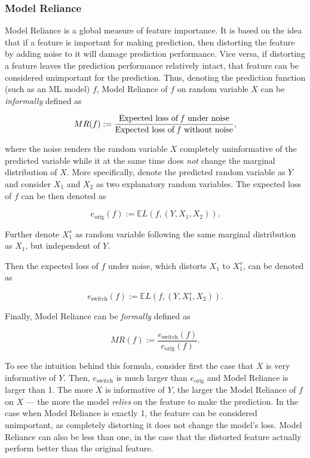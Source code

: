 		\subsubsection{Model Reliance}
			Model Reliance \citep{fisher2019all} is a global measure of feature importance. It is based on the idea that if a feature is important for making prediction, then distorting the feature by adding noise to it will damage prediction performance. Vice versa, if distorting a feature leaves the prediction performance relatively intact, that feature can be considered unimportant for the prediction. Thus, denoting  the prediction function (such as an ML model) $f$, Model Reliance of  $f$ on random variable $X$ can be \textit{informally} defined as
			
			\begin{equation*}
				MR(f):=\frac{\text{Expected loss of \textit{f} under noise}}{\text{Expected loss of \textit{f} without noise}},
			\end{equation*}
			
			where the noise renders the random variable $X$ completely uninformative of the predicted variable while it at the same time does \textit{not} change the marginal distribution of $X$. More specifically, denote the predicted random variable as $Y$ and consider $X_1$ and $X_2$ as two explanatory random variables. The expected loss of $f$ can be then denoted as 
			
			\begin{equation*}
				e_{\text{orig}}(f):= \mathbb{E} L(f,(Y,X_1, X_2)).
			\end{equation*} 
			
			Further denote $X_1^s$ as random variable following the same marginal distribution as $X_1$, but independent of $Y$. 
			
			Then the expected loss of $f$ under noise, which distorts $X_1$ to $X_1^s$, can be denoted as 
			
			\begin{equation*}
				e_{\text{switch}}(f):= \mathbb{E} L(f,(Y,X_1^s, X_2)).
			\end{equation*} 
			
			Finally, Model Reliance can be \textit{formally} defined as 
			
			\begin{equation*}
				MR(f):=\frac{e_{\text{switch}}(f)}{e_{\text{orig}}(f)}.
			\end{equation*}
			
			To see the intuition behind this formula, consider first the case that $X$ is very informative of $Y$. Then, 	$e_{\text{switch}}$ is much larger than $e_{\text{orig}}$ and Model Reliance is larger than 1. The more $X$ is informative of $Y$, the larger the  Model Reliance of $f$ on $X$ --- the more the model \textit{relies} on the feature to make the prediction. In the case when Model Reliance is exactly 1, the feature can be considered unimportant, as completely distorting it does not change the model's loss. Model Reliance can also be less than one, in the case that the distorted feature actually perform better than the original feature.
					
